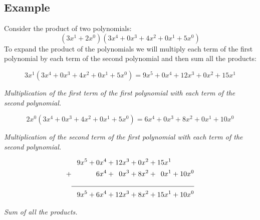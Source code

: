 \documentclass{article}
\begin{document}
\subsection*{Example}
Consider the product of two polynomials:
$$ (3x^1+2x^0)(3x^4 + 0x^3 + 4x^2 + 0x^1 + 5x^0) $$
To expand the product of the polynomials we will multiply each term of the first polynomial by each term of the second polynomial and then sum all the products:

$$ 3x^1(3x^4 + 0x^3 + 4x^2 + 0x^1 + 5x^0) = 9x^5 + 0x^4 + 12x^3 + 0x^2 + 15x^1 $$
\begin{center}
    \textit{Multiplication of the first term of the first polynomial with each term of the second polynomial.}
\end{center}

$$ 2x^0(3x^4 + 0x^3 + 4x^2 + 0x^1 + 5x^0) = 6x^4 + 0x^3 + 8x^2 + 0x^1 + 10x^0 $$
\begin{center}
    \textit{Multiplication of the second term of the first polynomial with each term of the second polynomial.}
\end{center}

\begin{align*}
      & \phantom{+} 9x^5 + 0x^4 + 12x^3 + 0x^2 + 15x^1                                           \\
    + & \phantom{+} \phantom{9x^5 + {}} 6x^4 + \phantom{1} 0x^3 + 8x^2 + \phantom{1}0x^1 + 10x^0 \\
    \cline{2-2}
      & \phantom{+} 9x^5 + 6x^4 + 12x^3 + 8x^2 + 15x^1 + 10x^0                                   \\
\end{align*}
\begin{center}
    \textit{Sum of all the products.}
\end{center}
\end{document}
